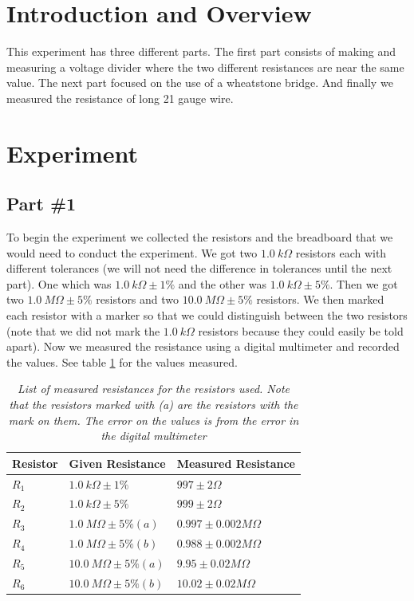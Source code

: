 \documentclass[11pt]{article}
\numberwithin{equation}{section}
\begin{document}


\section{Introduction and Overview}
This experiment has three different parts. The first part consists of making and measuring a voltage divider where the two different resistances are near the same value. The next part focused on the use of a wheatstone bridge. And finally we measured the resistance of long 21 gauge wire.  

\section{Experiment}
\subsection{Part \#1}
To begin the experiment we collected the resistors and the breadboard that we would need to conduct the experiment. We got two $1.0\ k\Omega$ resistors each with different tolerances (we will not need the difference in tolerances until the next part). One which was $1.0\ k\Omega\pm1\%$ and the other was $1.0\ k\Omega\pm5\%$. Then we got two $1.0\ M\Omega\pm5\%$ resistors and two $10.0\ M\Omega\pm5\%$ resistors. We then marked each resistor with a marker so that we could distinguish between the two resistors (note that we did not mark the $1.0\ k\Omega$ resistors because they could easily be told apart). Now we measured the resistance using a digital multimeter and recorded the values. See table \ref{Meas.Res} for the values measured.
\begin{table}[h]
\begin{center}
\begin{tabular}{l|l|l}
Resistor	&Given Resistance	&Measured Resistance \\
\hline
$R_1$		&$1.0\ k\Omega\pm1\%$	&$997\pm2 \Omega$\\
$R_2$		&$1.0\ k\Omega\pm5\%$	&$999\pm2 \Omega$\\
$R_3$		&$1.0\ M\Omega\pm5\%(a)$	&$0.997\pm0.002 M\Omega$\\
$R_4$		&$1.0\ M\Omega\pm5\%(b)$	&$0.988\pm0.002 M\Omega$\\
$R_5$		&$10.0\ M\Omega\pm5\%(a)$	&$9.95\pm0.02 M\Omega$\\
$R_6$		&$10.0\ M\Omega\pm5\%(b)$	&$10.02\pm0.02 M\Omega$
\end{tabular}
\end{center}
\caption{\textit{List of measured resistances for the resistors used. Note that the resistors marked with (a) are the resistors with the mark on them. The error on the values is from the error in the digital multimeter}}
\label{Meas.Res}
\end{table}
\end{document}
